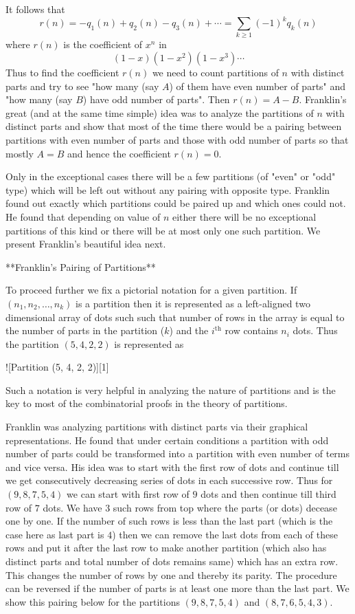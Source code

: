 It follows that $$r(n) = -q_{1}(n) + q_{2}(n) - q_{3}(n) + \cdots = \sum_{k \geq 1}(-1)^{k}q_{k}(n)$$ where $r(n)$ is the coefficient of $x^{n}$ in $$(1 - x)(1 - x^{2})(1 - x^{3})\cdots$$ Thus to find the coefficient $r(n)$ we need to count partitions of $n$ with distinct parts and try to see "how many (say $A$) of them have even number of parts" and "how many (say $B$) have odd number of parts". Then $r(n) = A - B$. Franklin's great (and at the same time simple) idea was to analyze the partitions of $n$ with distinct parts and show that most of the time there would be a pairing between partitions with even number of parts and those with odd number of parts so that mostly $A = B$ and hence the coefficient $r(n) = 0$.

Only in the exceptional cases there will be a few partitions (of "even" or "odd" type) which will be left out without any pairing with opposite type. Franklin found out exactly which partitions could be paired up and which ones could not. He found that depending on value of $n$ either there will be no exceptional partitions of this kind or there will be at most only one such partition. We present Franklin's beautiful idea next.

**Franklin's Pairing of Partitions**

To proceed further we fix a pictorial notation for a given partition. If $(n_{1}, n_{2}, \ldots, n_{k})$ is a partition then it is represented as a left-aligned two dimensional array of dots such such that number of rows in the array is equal to the number of parts in the partition ($k$) and the $i^{\text{th}}$ row contains $n_{i}$ dots. Thus the partition $(5, 4, 2, 2)$ is represented as

![Partition (5, 4, 2, 2)][1]

Such a notation is very helpful in analyzing the nature of partitions and is the key to most of the combinatorial proofs in the theory of partitions.

Franklin was analyzing partitions with distinct parts via their graphical representations. He found that under certain conditions a partition with odd number of parts could be transformed into a partition with even number of terms and vice versa. His idea was to start with the first row of dots and continue till we get consecutively decreasing series of dots in each successive row. Thus for $(9, 8, 7, 5, 4)$ we can start with first row of $9$ dots and then continue till third row of $7$ dots. We have $3$ such rows from top where the parts (or dots) decease one by one. If the number of such rows is less than the last part (which is the case here as last part is $4$) then we can remove the last dots from each of these rows and put it after the last row to make another partition (which also has distinct parts and total number of dots remains same) which has an extra row. This changes the number of rows by one and thereby its parity. The procedure can be reversed if the number of parts is at least one more than the last part. We show this pairing below for the partitions $(9, 8, 7, 5, 4)$ and $(8, 7, 6, 5, 4, 3)$.

